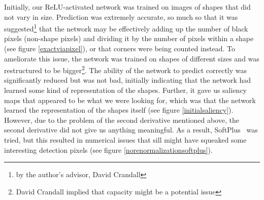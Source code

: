 Initially, our ReLU-activated network was trained on images of shapes that did not vary in size.
Prediction was extremely accurate, so much so that it was suggested\footnote{by the author's
advisor, David Crandall} that the network may be effectively adding up the number of black pixels
(non-shape pixels) and dividing it by the number of pixels within a shape (see figure
\ref{exactviapixel}), or that corners were being counted instead. To ameliorate this issue, the
network was trained on shapes of different sizes and was restructured to be bigger\footnote{David
Crandall implied that capacity might be a potential issue}. The ability of the network to predict
correctly was significantly reduced but was not bad, initially indicating that the network had
learned some kind of representation of the shapes. Further, it gave us saliency maps that appeared
to be what we were looking for, which was that the network learned the representation of the shapes
itself (see figure \ref{initialsaliency}). However, due to the problem of the second derivative
mentioned above, the second derivative did not give us anything meaningful. As a result,
SoftPlus~\cite{NIPS2000_44968aec} was tried, but this resulted in numerical issues that sill might
have squeaked some interesting detection pixels (see figure \ref{norenormalizationsoftplus}).

